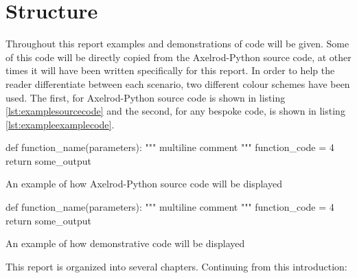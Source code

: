 \section{Structure}

Throughout this report examples and demonstrations of code will be given.
Some of this code will be directly copied from the Axelrod-Python source code, at other times it will have been written specifically for this report.
In order to help the reader differentiate between each scenario, two different colour schemes have been used.
The first, for Axelrod-Python source code is shown in listing \ref{lst:examplesourcecode} and the second, for any bespoke code, is shown in listing \ref{lst:exampleexamplecode}.

\begin{listing}[hbtp!]
\begin{SourceCode}
def function_name(parameters):
    """
    multiline comment
    """
    function_code = 4
    return some_output
\end{SourceCode}
\caption{An example of how Axelrod-Python source code will be displayed}
\label{lst:examplesourcecode}
\end{listing}

\begin{listing}[hbtp!]
\begin{ExampleCode}
def function_name(parameters):
    """
    multiline comment
    """
    function_code = 4
    return some_output
\end{ExampleCode}
\caption{An example of how demonstrative code will be displayed}
\label{lst:exampleexamplecode}
\end{listing}{}

This report is organized into several chapters. Continuing from this introduction:

